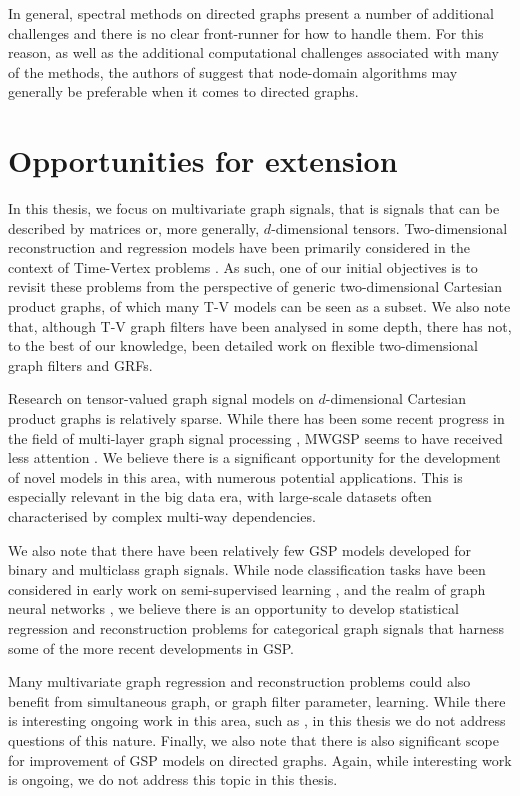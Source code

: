 In general, spectral methods on directed graphs present a number of additional challenges and there is no clear front-runner for how to handle them. For this reason, as well as the additional computational challenges associated with many of the methods, the authors of \cite{Marques2020} suggest that node-domain algorithms may generally be preferable when it comes to directed graphs. 


\section{Opportunities for extension}

In this thesis, we focus on multivariate graph signals, that is signals that
can be described by matrices or, more generally, $d$-dimensional tensors. Two-dimensional reconstruction and regression models have been primarily considered in the context of Time-Vertex problems \citep{Qiu2017,Ioannidis2016,Venkitaraman2019}. As such, one of our initial objectives is to revisit these problems from the perspective of generic two-dimensional Cartesian product graphs, of which many T-V models can be seen as a subset. We also note that, although T-V graph filters have been analysed in some depth, there has not, to the best of our knowledge, been detailed work on flexible two-dimensional graph filters and GRFs.

Research on tensor-valued graph signal models on $d$-dimensional Cartesian product graphs is relatively sparse. While there has been some recent progress in the field of multi-layer graph signal processing \citep{Zhang2023b}, MWGSP seems to have received less attention \citep{Stanley2020}. We believe there is a significant opportunity for the development of novel models in this area, with numerous potential applications. This is especially relevant in the big data era, with large-scale datasets often characterised by complex multi-way dependencies. 

We also note that there have been relatively few GSP models developed for binary and multiclass graph signals. While node classification tasks have been considered in early work on semi-supervised learning \citep{Belkin2002}, and the realm of graph neural networks \citep{Xiao2021b}, we believe there is an opportunity to develop statistical regression and reconstruction problems for categorical graph signals that harness some of the more recent developments in GSP. 

Many multivariate graph regression and reconstruction problems could also benefit from simultaneous graph, or graph filter parameter, learning. While there is interesting ongoing work in this area, such as \citep{Zhi2023}, in this thesis we do not address questions of this nature. Finally, we also note that there is also significant scope for improvement of GSP models on directed graphs. Again, while interesting work is ongoing, we do not address this topic in this thesis. 